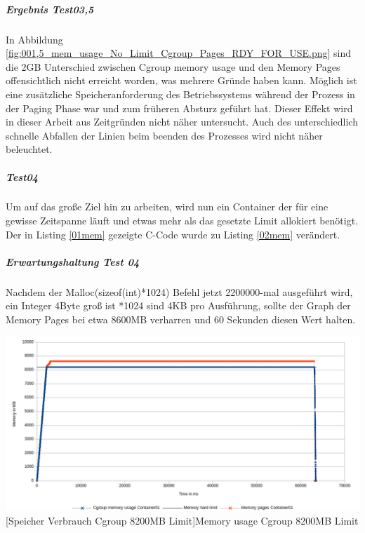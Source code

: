 \subparagraph{Ergebnis Test03,5}
In Abbildung \ref{fig:001,5_mem_usage_No_Limit_Cgroup_Pages_RDY_FOR_USE.png} sind die 2GB Unterschied zwischen \glqq{}Cgroup memory usage\grqq{} und den \glqq{}Memory Pages\grqq{} offensichtlich nicht erreicht worden, was mehrere Gründe haben kann. Möglich ist eine zusätzliche Speicheranforderung des Betriebssystems während der Prozess in der Paging Phase war und zum früheren Absturz geführt hat. Dieser Effekt wird in dieser Arbeit aus Zeitgründen nicht näher untersucht. Auch des unterschiedlich schnelle Abfallen der Linien beim beenden des Prozesses wird nicht näher beleuchtet. 



\subparagraph{Test04}
Um auf das große Ziel hin zu arbeiten, wird nun ein Container der für eine gewisse Zeitspanne läuft und etwas mehr als das gesetzte Limit allokiert benötigt. Der in Listing \ref{01mem} gezeigte C-Code wurde zu Listing \ref{02mem} verändert. 

\vspace{1em}


\subparagraph{Erwartungshaltung Test 04}
Nachdem der Malloc(sizeof(int)*1024) Befehl jetzt 2200000-mal ausgeführt wird, ein Integer 4Byte groß ist *1024 sind 4KB pro Ausführung, sollte der Graph der Memory Pages bei etwa 8600MB verharren und 60 Sekunden diesen Wert halten.

\vspace{1em}
\begin{minipage}{\linewidth}
	\centering
	\includegraphics[width=1\linewidth]{pics/004_mem_usage_8200mb_limit_Container01_Basis_RDY_FOR_USE.png}
	[Speicher Verbrauch Cgroup 8200MB Limit]{Memory usage Cgroup 8200MB Limit}
	\label{fig:004_mem_usage_8200mb_limit_Container01_Basis_RDY_FOR_USE}
\end{minipage}

